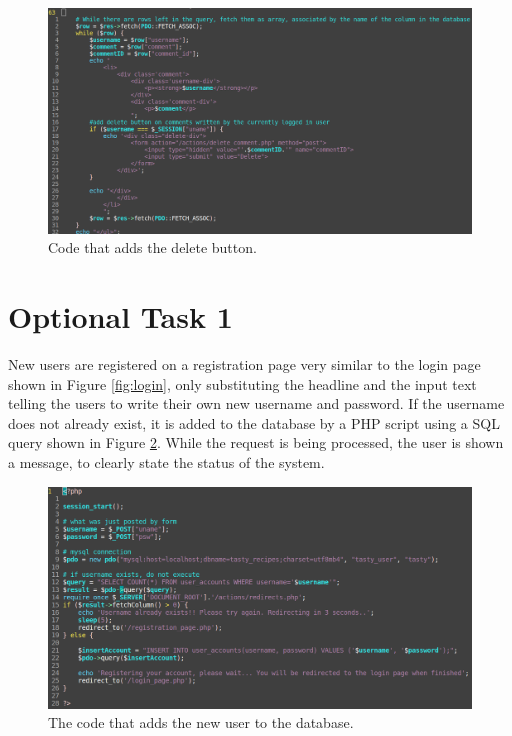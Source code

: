 \documentclass[a4paper]{scrreprt}
\begin{document}
\begin{figure}[h!]
  \begin{center}
    \includegraphics[scale=0.41]{img/delete.png}
    \caption{Code that adds the delete button.}
    \label{fig:delete}
  \end{center}
\end{figure}

\section{Optional Task 1}

New users are registered on a registration page very similar to the login page shown in Figure \ref{fig:login}, only substituting the headline and the input text telling the users to write their own new username and password. If the username does not already exist, it is added to the database by a PHP script using a SQL query shown in Figure \ref{fig:register}. While the request is being processed, the user is shown a message, to clearly state the status of the system.

\begin{figure}[h!]
  \begin{center}
    \includegraphics[scale=0.41]{img/register.png}
    \caption{The code that adds the new user to the database.}
    \label{fig:register}
  \end{center}
\end{figure}
\end{document}
